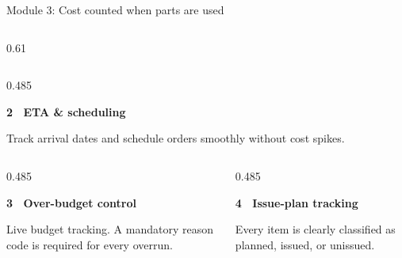 \begin{frame}{Module 3: Cost counted when parts are used}
\begin{columns}[T]
\begin{column}{0.61\textwidth}
\begin{columns}[T]
                \begin{column}{0.485\textwidth}
                    \begin{minimalcard}[height=2.4cm]
                        {\fontsize{8}{10}\bfseries\selectfont\color{primary}2 \textbullet\ ETA \& scheduling}\par
                        \vspace{0.15cm}
                        {\fontsize{7.2}{9.5}\selectfont\color{mutedgray}
                        Track arrival dates and schedule orders smoothly without cost spikes.
                        }
                    \end{minimalcard}
                \end{column}
            \end{columns}
            
            \vspace{0.15cm}
            
            \begin{columns}[T]
                \begin{column}{0.485\textwidth}
                    \begin{minimalcard}[height=2.4cm]
                        {\fontsize{8}{10}\bfseries\selectfont\color{primary}3 \textbullet\ Over-budget control}\par
                        \vspace{0.15cm}
                        {\fontsize{7.2}{9.5}\selectfont\color{mutedgray}
                        Live budget tracking. A mandatory reason code is required for every overrun.
                        }
                    \end{minimalcard}
                \end{column}
                
                \begin{column}{0.485\textwidth}
                    \begin{minimalcard}[height=2.4cm]
                        {\fontsize{8}{10}\bfseries\selectfont\color{primary}4 \textbullet\ Issue-plan tracking}\par
                        \vspace{0.15cm}
                        {\fontsize{7.2}{9.5}\selectfont\color{mutedgray}
                        Every item is clearly classified as planned, issued, or unissued.
                        }
                    \end{minimalcard}
                \end{column}
            \end{columns}
        \end{column}
    \end{columns}
\end{frame}
